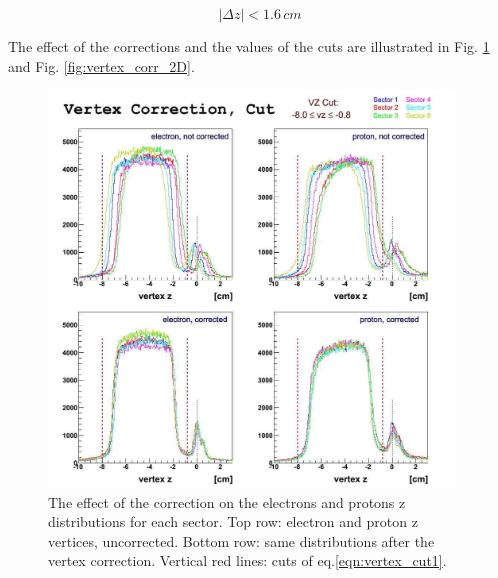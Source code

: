 \begin{equation}
 \left| \Delta z \right| < 1.6 \,cm
 \label{eqn:vertex_cut2} 
\end{equation}

The effect of the corrections and the values of the cuts are illustrated in 
Fig. \ref{fig:vertex_corr} and  Fig. \ref{fig:vertex_corr_2D}.

\begin{figure}[h]
	\centering
		\includegraphics[width=0.96\textwidth ]{img/vtx_all_sector.jpg}
			\caption{The effect of the correction on the electrons and protons z 
						distributions for each sector. Top row: electron and proton
						z vertices, uncorrected. Bottom row: same distributions after
						the vertex correction. Vertical red lines: cuts of eq.\ref{eqn:vertex_cut1}. }
			\label{fig:vertex_corr}
\end{figure}

